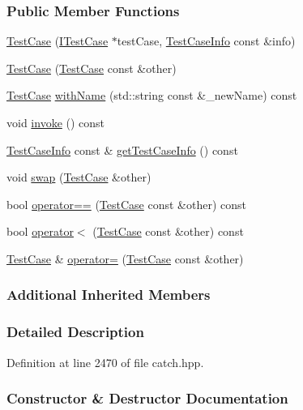 \subsubsection*{Public Member Functions}
\begin{DoxyCompactItemize}
\item 
\hyperlink{a00085_a03a5b913484681bd6d398dc5e9c2a907}{Test\+Case} (\hyperlink{a00045}{I\+Test\+Case} $\ast$test\+Case, \hyperlink{a00086}{Test\+Case\+Info} const \&info)
\item 
\hyperlink{a00085_ac0011d3789edc3e44edb41f13c4775a0}{Test\+Case} (\hyperlink{a00085}{Test\+Case} const \&other)
\item 
\hyperlink{a00085}{Test\+Case} \hyperlink{a00085_ab6dbc6c82b7c1680013c67bdedccfc8e}{with\+Name} (std\+::string const \&\+\_\+new\+Name) const 
\item 
void \hyperlink{a00085_aac2e028135cc88c3e3aac04650960a6c}{invoke} () const 
\item 
\hyperlink{a00086}{Test\+Case\+Info} const \& \hyperlink{a00085_a25c03661ab092431cdff10df5c58a5a7}{get\+Test\+Case\+Info} () const 
\item 
void \hyperlink{a00085_aee38f908faf10b905b209ca388275413}{swap} (\hyperlink{a00085}{Test\+Case} \&other)
\item 
bool \hyperlink{a00085_a40eab521b316c7d476f6b4dd1c33eec8}{operator==} (\hyperlink{a00085}{Test\+Case} const \&other) const 
\item 
bool \hyperlink{a00085_aa5174e85e3aac6e7398dee9c76730324}{operator$<$} (\hyperlink{a00085}{Test\+Case} const \&other) const 
\item 
\hyperlink{a00085}{Test\+Case} \& \hyperlink{a00085_a8022e3f74232f7887d2d2cbbc8876502}{operator=} (\hyperlink{a00085}{Test\+Case} const \&other)
\end{DoxyCompactItemize}
\subsubsection*{Additional Inherited Members}


\subsubsection{Detailed Description}


Definition at line 2470 of file catch.\+hpp.



\subsubsection{Constructor \& Destructor Documentation}
\hypertarget{a00085_a03a5b913484681bd6d398dc5e9c2a907}{}
